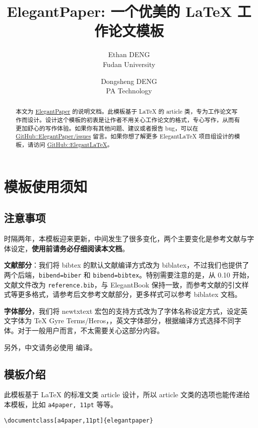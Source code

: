 \documentclass[lang=cn,a4paper]{elegantpaper}
\title{ElegantPaper: 一个优美的 \LaTeX{} 工作论文模板}
\author{Ethan DENG \\ Fudan University \and Dongsheng DENG \\ PA Technology}
\institute{\href{https://elegantlatex.org/}{Elegant\LaTeX{} 项目组}}
\date{\zhtoday}
\begin{document}
\maketitle

\begin{abstract}
本文为 \href{https://github.com/ElegantLaTeX/ElegantPaper/}{ElegantPaper} 的说明文档。此模板基于 \LaTeX{} 的 article 类，专为工作论文写作而设计。设计这个模板的初衷是让作者不用关心工作论文的格式，专心写作，从而有更加舒心的写作体验。如果你有其他问题、建议或者报告 bug，可以在 \href{https://github.com/ElegantLaTeX/ElegantPaper/issues}{GitHub::ElegantPaper/issues} 留言。如果你想了解更多 Elegant\LaTeX{} 项目组设计的模板，请访问 \href{https://github.com/ElegantLaTeX/}{GitHub::ElegantLaTeX}。
\end{abstract}

\section{模板使用须知}

\subsection{注意事项}

时隔两年，本模板迎来更新，中间发生了很多变化，两个主要变化是参考文献与字体设定，\textbf{使用前请务必仔细阅读本文档}。

\textbf{文献部分}：我们将 bibtex 的默认文献编译方式改为 biblatex，不过我们也提供了两个后端，\lstinline{bibend=biber} 和 \lstinline{bibend=bibtex}。特别需要注意的是，从 0.10 开始，文献文件改为 \lstinline{reference.bib}，与 ElegantBook 保持一致，而参考文献的引文样式等更多格式，请参考后文参考文献部分，更多样式可以参考 biblatex 文档。 

\textbf{字体部分}，我们将 newtxtext 宏包的支持方式改为了字体名称设定方式，设定英文字体为 TeX Gyre Terms/Heros，，英文字体部分，根据编译方式选择不同字体。对于一般用户而言，不太需要关心这部分内容。

另外，中文请务必使用  编译。

\subsection{模板介绍}

此模板基于 \LaTeX{} 的标准文类 article 设计，所以 article 文类的选项也能传递给本模板，比如 \lstinline{a4paper, 11pt} 等等。

\begin{lstlisting}
\documentclass[a4paper,11pt]{elegantpaper}
\end{lstlisting}
\end{document}
